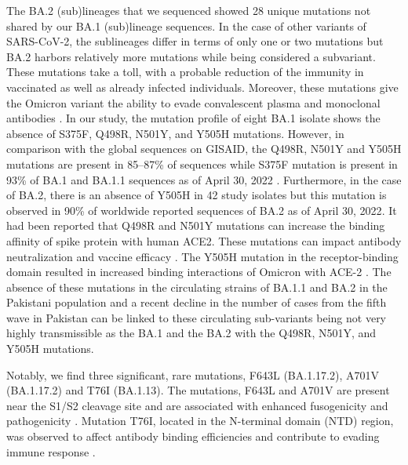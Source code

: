 The BA.2 (sub)lineages that we sequenced showed 28 unique mutations not shared by our BA.1 (sub)lineage sequences.
In the case of other variants of SARS-CoV-2, the sublineages differ in terms of only one or two mutations but BA.2 harbors relatively more mutations while being considered a subvariant.
These mutations take a toll, with a probable reduction of the immunity in vaccinated as well as already infected individuals.
Moreover, these mutations give the Omicron variant the ability to evade convalescent plasma and monoclonal antibodies \citep{ai2022antibody, altarawneh2022effect}.
In our study, the mutation profile of eight BA.1 isolate shows the absence of S375F, Q498R, N501Y, and Y505H mutations.
However, in comparison with the global sequences on GISAID, the Q498R, N501Y and Y505H mutations are present in 85--87\% of sequences while S375F mutation is present in 93\% of BA.1 and BA.1.1 sequences as of April 30, 2022 \citep{shu2017gisaid}.
Furthermore, in the case of BA.2, there is an absence of Y505H in 42 study isolates but this mutation is observed in 90\% of worldwide reported sequences of BA.2 as of April 30, 2022\citep{shu2017gisaid}.
It had been reported that Q498R and N501Y mutations can increase the binding affinity of spike protein with human ACE2.
These mutations can impact antibody neutralization and vaccine efficacy \citep{schubert2022human}.
The Y505H mutation in the receptor-binding domain resulted in increased binding interactions of Omicron with ACE-2 \citep{ortega2021Omicron}.
The absence of these mutations in the circulating strains of BA.1.1 and BA.2 in the Pakistani population and a recent decline in the number of cases from the fifth wave in Pakistan can be linked to these circulating sub-variants being not
very highly transmissible as the BA.1 and the BA.2 with the Q498R, N501Y, and Y505H mutations.

Notably, we find three significant, rare mutations, F643L (BA.1.17.2), A701V (BA.1.17.2) and T76I (BA.1.13).
The mutations, F643L and A701V are present near the S1/S2 cleavage site and are associated with enhanced fusogenicity and pathogenicity \citep{saito2022enhanced}.
Mutation T76I, located in the N-terminal domain (NTD) region, was observed to affect antibody binding efficiencies and contribute to evading immune response \citep{ou2022tracking}.

